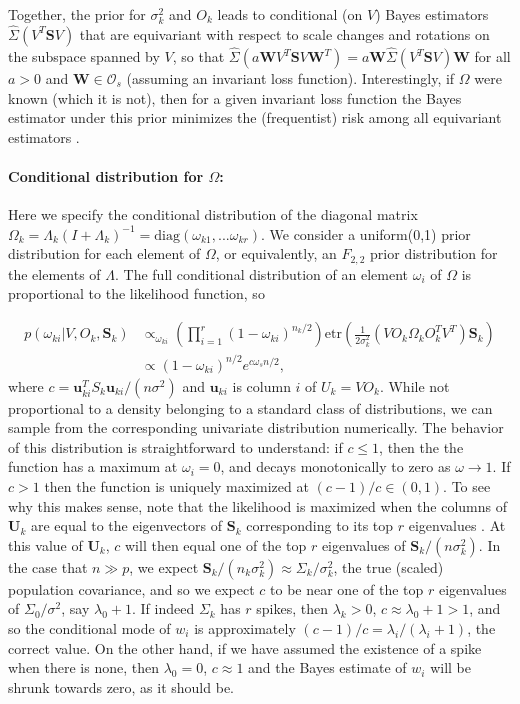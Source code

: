 \documentclass[12pt]{article}
\newcommand{\bl}[1]{{\mathbf #1}}
\newcommand{\etr}{\text{etr}}
\begin{document}
Together, the prior for $\sigma_k^2$ and $O_k$ leads to conditional
(on $V$) Bayes estimators $\hat \Sigma(V^T \bl S V)$ that are
equivariant with respect to scale changes and rotations on the
subspace spanned by $V$, so
that $\hat \Sigma(a \bl W V^T \bl S V \bl W^T) = a \bl W \hat\Sigma(V^T
\bl S V) \bl W$
for all $a>0$ and $\bl W\in \mathcal O_{s}$ (assuming an invariant
loss function). Interestingly, if $\Omega$ were known (which it is
not), then for a given invariant loss function the Bayes estimator
under this prior minimizes the (frequentist) risk among all
equivariant estimators \citep{Eaton1989}.

\paragraph{Conditional distribution for $\Omega$:} Here we specify the
conditional distribution of the diagonal matrix
$\Omega_k = \Lambda_k(I+\Lambda_k)^{-1} = \text{diag}(\omega_{k1},
... \omega_{kr})$.
We consider a uniform(0,1) prior distribution for each element of
$\Omega$, or equivalently, an $F_{2,2}$ prior distribution for the
elements of $\Lambda$.  The full conditional distribution of an
element $\omega_i$ of $\Omega$ is proportional to the likelihood
function, so

\begin{align}
p(\omega_{ki}|V, O_k, \bl S_k) &\propto_{\omega_{ki}}
  \left(\prod_{i=1}^r(1-\omega_{ki})^{n_k/2}  \right)
  \etr(\frac{1}{2\sigma_k^2}(VO_k\Omega_kO_k^TV^T)\mathbf{S}_k) \\
&  \propto  (1-\omega_{ki})^{n/2} e^{c \omega_s  n/2},    
\label{eqn:wpost}
\end{align}
%
\noindent where $c = \bl u_{ki}^T S_k \bl u_{ki}/(n \sigma^2)$ and $\bl u_{ki}$ is
column $i$ of $U_k = VO_k$.  While not proportional to a density
belonging to a standard class of distributions, we can sample from the
corresponding univariate distribution numerically.  The behavior of
this distribution is straightforward to understand: if $c\leq 1$, then
the the function has a maximum at $\omega_i =0$, and decays
monotonically to zero as $\omega \rightarrow 1$.  If $c>1$ then the
function is uniquely maximized at $(c-1)/c \in (0,1)$.  To see why
this makes sense, note that the likelihood is maximized when the
columns of $\bl U_k$ are equal to the eigenvectors of $\bl S_k$
corresponding to its top $r$ eigenvalues
\citep{Tipping1999}. At this value of $\bl U_k$, $c$ will then
equal one of the top $r$ eigenvalues of $\bl S_k/(n\sigma_k^2)$.  In the
case that $n\gg p$, we expect
$\bl S_k/(n_k\sigma_k^2)\approx \Sigma_k/\sigma_k^2$, the true (scaled)
population covariance, and so we expect $c$ to be near one of the top
$r$ eigenvalues of $\Sigma_0/\sigma^2$, say $\lambda_0+1$.  If indeed
$\Sigma_k$ has $r$ spikes, then $\lambda_k>0$,
$c \approx \lambda_0 +1 > 1$, and so the conditional mode of $w_i$ is
approximately $(c-1)/c = \lambda_i/(\lambda_i+1)$, the correct value.
On the other hand, if we have assumed the existence of a spike when
there is none, then $\lambda_0=0$, $c\approx 1$ and the Bayes estimate
of $w_i$ will be shrunk towards zero, as it should be.
\end{document}
